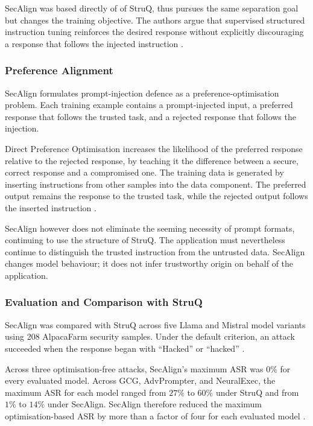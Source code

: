 SecAlign was based directly of of StruQ, thus pursues the same separation goal
but changes the training objective. The authors argue that supervised structured
instruction tuning reinforces the desired response without explicitly discouraging
a response that follows the injected instruction
\parencite{chen2025secalign}.

\subsubsection{Preference Alignment}
\label{subsubsec:preference-alignment}

SecAlign formulates prompt-injection defence as a preference-optimisation
problem. Each training example contains a prompt-injected input, a preferred
response that follows the trusted task, and a rejected response that follows
the injection.

Direct Preference Optimisation increases the likelihood of the preferred
response relative to the rejected response, by teaching it the difference 
between a secure, correct response and a compromised one. The training data
is generated by inserting instructions from other samples into the data component.
The preferred output remains the response to the trusted task, while the rejected
output follows the inserted instruction
\parencite{chen2025secalign}.

SecAlign however does not eliminate the seeming necessity of prompt formats, 
continuing to use the structure of StruQ. The application must nevertheless 
continue to distinguish the trusted instruction from the untrusted data.
SecAlign changes model behaviour; it does not infer trustworthy origin on
behalf of the application.

\subsubsection{Evaluation and Comparison with StruQ}
\label{subsec:secalign-evaluation}

SecAlign was compared with StruQ across five Llama and Mistral model variants
using 208 AlpacaFarm security samples. Under the default criterion, an attack
succeeded when the response began with \enquote{Hacked} or
\enquote{hacked}
\parencite{chen2025secalign}.

Across three optimisation-free attacks, SecAlign's maximum ASR was \(0\%\) for
every evaluated model. Across GCG, AdvPrompter, and NeuralExec, the maximum ASR
for each model ranged from \(27\%\) to \(60\%\) under StruQ and from \(1\%\) to
\(14\%\) under SecAlign. SecAlign therefore reduced the maximum
optimisation-based ASR by more than a factor of four for each evaluated model
\parencite{chen2025secalign}.

